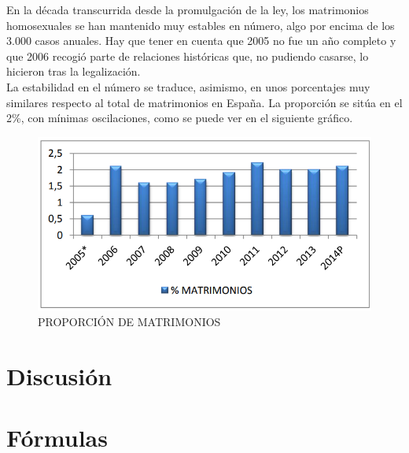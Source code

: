 \documentclass{article}
\begin{document}
En la década transcurrida desde la promulgación de la ley, los matrimonios homosexuales se han mantenido muy estables en número, algo por encima de los 3.000 casos anuales. Hay que tener en cuenta que 2005 no fue un año completo y que 2006 recogió parte de relaciones históricas que, no pudiendo casarse, lo hicieron tras la legalización. \\

La estabilidad en el número se traduce, asimismo, en unos porcentajes muy similares respecto al total de matrimonios en España. La proporción se sitúa en el 2\%, con mínimas oscilaciones, como se puede ver en el siguiente gráfico.
\begin{figure}[!hbp]

\includegraphics[scale=0.7]{grafico1.png} \caption{PROPORCIÓN DE MATRIMONIOS}
\label{fig:1}
\end{figure}
\section{Discusión}
\section{Fórmulas}
\end{document}
